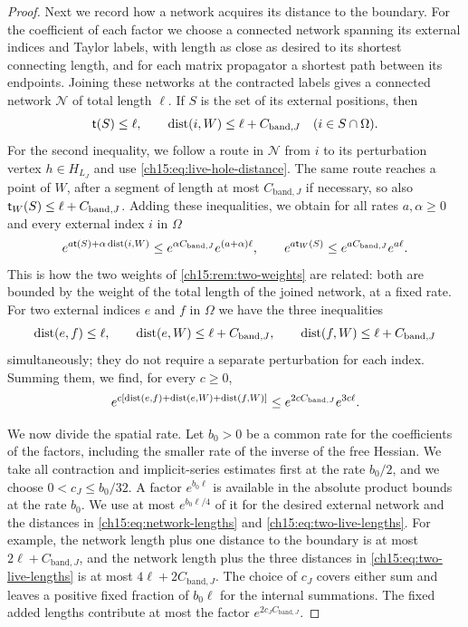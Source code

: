 \begin{proof}
Next we record how a network acquires its distance to the boundary. For the coefficient of each factor we choose a connected network spanning its external indices and Taylor labels, with length as close as desired to its shortest connecting length, and for each matrix propagator a shortest path between its endpoints. Joining these networks at the contracted labels gives a connected network $\mathcal N$ of total length $\ell$. If $S$ is the set of its external positions, then
\begin{equation}\label{ch15:eq:network-lengths}
 \mathsf t(S)\le\ell,\qquad
 \operatorname{dist}(i,W)\le\ell+C_{\mathrm{band},J}
            \quad(i\in S\cap\Omega).
\end{equation}
For the second inequality, we follow a route in $\mathcal N$ from $i$ to its perturbation vertex $h\in H_{L_J}$ and use \eqref{ch15:eq:live-hole-distance}. The same route reaches a point of $W$, after a segment of length at most $C_{\mathrm{band},J}$ if necessary, so also $\mathsf t_W(S)\le\ell+C_{\mathrm{band},J}$. Adding these inequalities, we obtain for all rates $a,\alpha\ge0$ and every external index $i$ in $\Omega$
\begin{equation}\label{ch15:eq:weight-conversion}
 e^{a\mathsf t(S)+\alpha\operatorname{dist}(i,W)}\le e^{\alpha C_{\mathrm{band},J}}e^{(a+\alpha)\ell},
 \qquad
 e^{a\mathsf t_W(S)}\le e^{aC_{\mathrm{band},J}}e^{a\ell}.
\end{equation}
This is how the two weights of \cref{ch15:rem:two-weights} are related: both are bounded by the weight of the total length of the joined network, at a fixed rate. For two external indices $e$ and $f$ in $\Omega$ we have the three inequalities
\begin{equation}\label{ch15:eq:two-live-lengths}
 \operatorname{dist}(e,f)\le\ell,\qquad
 \operatorname{dist}(e,W)\le\ell+C_{\mathrm{band},J},\qquad
 \operatorname{dist}(f,W)\le\ell+C_{\mathrm{band},J}
\end{equation}
simultaneously; they do not require a separate perturbation for each index. Summing them, we find, for every $c\ge0$,
\begin{equation}\label{ch15:eq:two-index-weight}
 e^{c[\operatorname{dist}(e,f)+\operatorname{dist}(e,W)+\operatorname{dist}(f,W)]}
 \le e^{2cC_{\mathrm{band},J}}e^{3c\ell}.
\end{equation}

We now divide the spatial rate. Let $b_0>0$ be a common rate for the coefficients of the factors, including the smaller rate of the inverse of the free Hessian. We take all contraction and implicit-series estimates first at the rate $b_0/2$, and we choose $0<c_J\le b_0/32$. A factor $e^{b_0\ell}$ is available in the absolute product bounds at the rate $b_0$. We use at most $e^{b_0\ell/4}$ of it for the desired external network and the distances in \eqref{ch15:eq:network-lengths} and \eqref{ch15:eq:two-live-lengths}. For example, the network length plus one distance to the boundary is at most $2\ell+C_{\mathrm{band},J}$, and the network length plus the three distances in \eqref{ch15:eq:two-live-lengths} is at most $4\ell+2C_{\mathrm{band},J}$. The choice of $c_J$ covers either sum and leaves a positive fixed fraction of $b_0\ell$ for the internal summations. The fixed added lengths contribute at most the factor $e^{2c_JC_{\mathrm{band},J}}$.


\end{proof}
